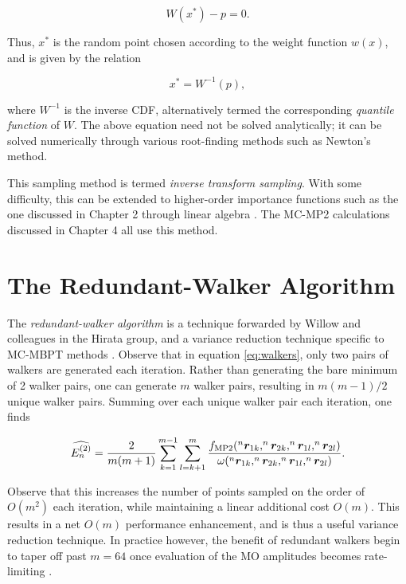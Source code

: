 \begin{equation}
W(x^*) - p = 0.
\end{equation}

\noindent Thus, $x^*$ is the random point chosen according to the weight
function $w(x)$, and is given by the relation

\begin{equation}
x^* = W^{-1}(p),
\end{equation}

\noindent where $W^{-1}$ is the inverse CDF, alternatively termed the
corresponding \emph{quantile function} of $W$. The above equation need not be
solved analytically; it can be solved numerically through various root-finding
methods such as Newton's method.

This sampling method is termed \emph{inverse transform sampling}. With some
difficulty, this can be extended to higher-order importance functions such as
the one discussed in Chapter 2 through linear algebra \cite{heath}. The MC-MP2
calculations discussed in Chapter 4 all use this method.

\section{The Redundant-Walker Algorithm}
\label{s:redundant}

The \emph{redundant-walker algorithm} is a technique forwarded by Willow and
colleagues in the Hirata group, and a variance reduction technique specific to
MC-MBPT methods \cite{redundant}. Observe that in equation \ref{eq:walkers},
only two pairs of walkers are generated each iteration. Rather than generating
the bare minimum of 2 walker pairs, one can generate $m$ walker pairs, resulting
in $m(m-1)/2$ unique walker pairs. Summing over each unique walker pair each
iteration, one finds

\begin{equation}
\widehat{\perturbE[n]{2}} = \frac{2}{m(m+1)} \sum^{m - 1}_{k = 1} \sum^m_{l = k + 1}
\frac
{f_\text{MP2}(^n\bm r_{1k}, ^n\bm r_{2k}, ^n\bm r_{1l}, ^n\bm r_{2l})}
{\omega(^n\bm r_{1k}, ^n\bm r_{2k}, ^n\bm r_{1l}, ^n\bm r_{2l})}.
\end{equation}

Observe that this increases the number of points sampled on the order of
$O(m^2)$ each iteration, while maintaining a linear additional cost $O(m)$.
This results in a net $O(m)$ performance enhancement, and is thus a useful
variance reduction technique. In practice however, the benefit of redundant
walkers begin to taper off past $m = 64$ once evaluation of the MO amplitudes
becomes rate-limiting \cite{redundant}.

